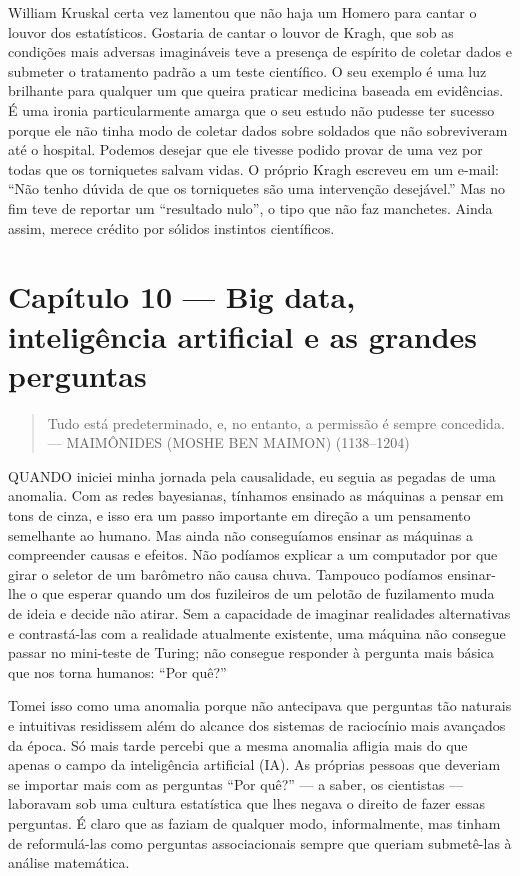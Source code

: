 \documentclass[11pt,a5paper,twoside]{book}
\begin{document}
William Kruskal certa vez lamentou que não haja um Homero para cantar o louvor dos estatísticos. Gostaria de cantar o louvor de Kragh, que sob as condições mais adversas imagináveis teve a presença de espírito de coletar dados e submeter o tratamento padrão a um teste científico. O seu exemplo é uma luz brilhante para qualquer um que queira praticar medicina baseada em evidências. É uma ironia particularmente amarga que o seu estudo não pudesse ter sucesso porque ele não tinha modo de coletar dados sobre soldados que não sobreviveram até o hospital. Podemos desejar que ele tivesse podido provar de uma vez por todas que os torniquetes salvam vidas. O próprio Kragh escreveu em um e-mail: “Não tenho dúvida de que os torniquetes são uma intervenção desejável.” Mas no fim teve de reportar um “resultado nulo”, o tipo que não faz manchetes. Ainda assim, merece crédito por sólidos instintos científicos.

\chapter{Capítulo 10 — Big data, inteligência artificial e as grandes perguntas}
\begin{quote}
Tudo está predeterminado, e, no entanto, a permissão é sempre concedida.   — MAIMÔNIDES (MOSHE BEN MAIMON) (1138–1204)
\end{quote}
QUANDO iniciei minha jornada pela causalidade, eu seguia as pegadas de uma anomalia. Com as redes bayesianas, tínhamos ensinado as máquinas a pensar em tons de cinza, e isso era um passo importante em direção a um pensamento semelhante ao humano. Mas ainda não conseguíamos ensinar as máquinas a compreender causas e efeitos. Não podíamos explicar a um computador por que girar o seletor de um barômetro não causa chuva. Tampouco podíamos ensinar-lhe o que esperar quando um dos fuzileiros de um pelotão de fuzilamento muda de ideia e decide não atirar. Sem a capacidade de imaginar realidades alternativas e contrastá-las com a realidade atualmente existente, uma máquina não consegue passar no mini-teste de Turing; não consegue responder à pergunta mais básica que nos torna humanos: “Por quê?”

Tomei isso como uma anomalia porque não antecipava que perguntas tão naturais e intuitivas residissem além do alcance dos sistemas de raciocínio mais avançados da época. Só mais tarde percebi que a mesma anomalia afligia mais do que apenas o campo da inteligência artificial (IA). As próprias pessoas que deveriam se importar mais com as perguntas “Por quê?” — a saber, os cientistas — laboravam sob uma cultura estatística que lhes negava o direito de fazer essas perguntas. É claro que as faziam de qualquer modo, informalmente, mas tinham de reformulá-las como perguntas associacionais sempre que queriam submetê-las à análise matemática.
\end{document}
